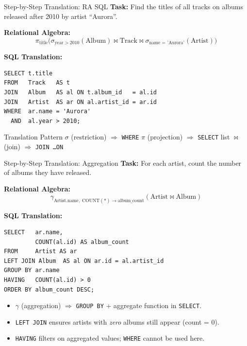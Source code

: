 \begin{frame}[fragile]{Step-by-Step Translation: RA \textrightarrow{} SQL}
  \textbf{Task:} Find the titles of all tracks on albums released after 2010 by artist ``Aurora''.

  \medskip
  \textbf{Relational Algebra:}
  \[
    \pi_{\text{title}}
      \bigl(
        \sigma_{\text{year} > 2010}(\text{Album})
        \bowtie
        \text{Track}
        \bowtie
        \sigma_{\text{name = 'Aurora'}}(\text{Artist})
      \bigr)
  \]

  \textbf{SQL Translation:}
  \begin{lstlisting}[style=sqlstyle]
SELECT t.title
FROM   Track   AS t
JOIN   Album   AS al ON t.album_id   = al.id
JOIN   Artist  AS ar ON al.artist_id = ar.id
WHERE  ar.name = 'Aurora'
  AND  al.year > 2010;
  \end{lstlisting}

  \begin{block}{Translation Pattern}
    $\sigma$ (restriction) $\Rightarrow$ \texttt{WHERE} \quad
    $\pi$ (projection) $\Rightarrow$ \texttt{SELECT} list \quad
    $\bowtie$ (join) $\Rightarrow$ \texttt{JOIN \ldots ON}
  \end{block}
\end{frame}

\begin{frame}[fragile]{Step-by-Step Translation: Aggregation}
  \textbf{Task:} For each artist, count the number of albums they have released.

  \medskip
  \textbf{Relational Algebra:}
  \[
    \gamma_{\text{Artist.name},\; \text{COUNT}(*) \to \text{album\_count}}
      (\text{Artist} \bowtie \text{Album})
  \]

  \textbf{SQL Translation:}
  \begin{lstlisting}[style=sqlstyle]
SELECT   ar.name,
         COUNT(al.id) AS album_count
FROM     Artist AS ar
LEFT JOIN Album  AS al ON ar.id = al.artist_id
GROUP BY ar.name
HAVING   COUNT(al.id) > 0
ORDER BY album_count DESC;
  \end{lstlisting}

  \begin{itemize}
    \item $\gamma$ (aggregation) $\Rightarrow$ \texttt{GROUP BY} + aggregate function in \texttt{SELECT}.
    \item \texttt{LEFT JOIN} ensures artists with \emph{zero} albums still appear (count = 0).
    \item \texttt{HAVING} filters on aggregated values; \texttt{WHERE} cannot be used here.
  \end{itemize}
\end{frame}

